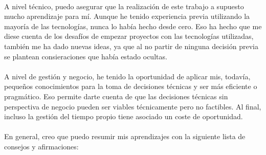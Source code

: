 \paragraph{}A nivel técnico, puedo asegurar que la realización de este trabajo a supuesto
mucho aprendizaje para mí. Aunque he tenido experiencia previa utilizando la mayoría
de las tecnologías, nunca lo había hecho desde cero. Eso ha hecho que me diese cuenta
de los desafíos de empezar proyectos con las tecnologías utilizadas, también me ha dado
nuevas ideas, ya que al no partir de ninguna decisión previa se plantean consieraciones
que había estado ocultas.

\paragraph{}A nivel de gestión y negocio, he tenido la oportunidad de aplicar mis,
todavía, pequeños conocimientos para la toma de decisiones técnicas y ser más eficiente
o pragmático. Eso permite darte cuenta de que las decisiones técnicas sin perspectiva
de negocio pueden ser viables técnicamente pero no factibles. Al final, incluso la
gestión del tiempo propio tiene asociado un coste de oportunidad.

\paragraph{}En general, creo que puedo resumir mis aprendizajes con la siguiente lista
de consejos y afirmaciones:

